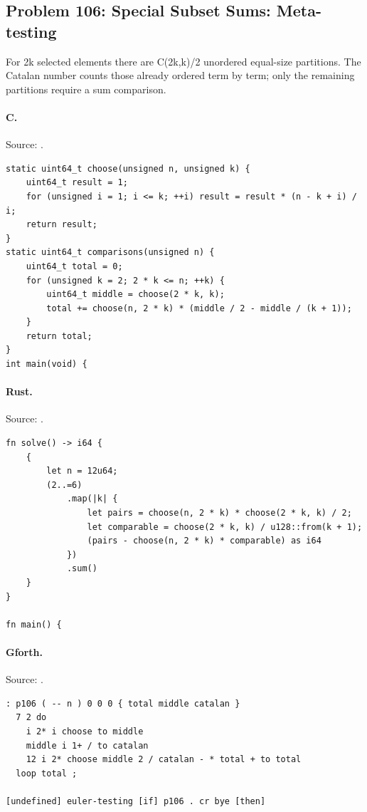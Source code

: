 \subsection{Problem 106: Special Subset Sums: Meta-testing}
\label{walkthrough:p106}
For 2k selected elements there are C(2k,k)/2 unordered equal-size partitions. The Catalan number counts those already ordered term by term; only the remaining partitions require a sum comparison.

\paragraph{C.} Source: .
\begin{lstlisting}
static uint64_t choose(unsigned n, unsigned k) {
    uint64_t result = 1;
    for (unsigned i = 1; i <= k; ++i) result = result * (n - k + i) / i;
    return result;
}
static uint64_t comparisons(unsigned n) {
    uint64_t total = 0;
    for (unsigned k = 2; 2 * k <= n; ++k) {
        uint64_t middle = choose(2 * k, k);
        total += choose(n, 2 * k) * (middle / 2 - middle / (k + 1));
    }
    return total;
}
int main(void) {
\end{lstlisting}

\paragraph{Rust.} Source: .
\begin{lstlisting}
fn solve() -> i64 {
    {
        let n = 12u64;
        (2..=6)
            .map(|k| {
                let pairs = choose(n, 2 * k) * choose(2 * k, k) / 2;
                let comparable = choose(2 * k, k) / u128::from(k + 1);
                (pairs - choose(n, 2 * k) * comparable) as i64
            })
            .sum()
    }
}

fn main() {
\end{lstlisting}

\paragraph{Gforth.} Source: .
\begin{lstlisting}
: p106 ( -- n ) 0 0 0 { total middle catalan }
  7 2 do
    i 2* i choose to middle
    middle i 1+ / to catalan
    12 i 2* choose middle 2 / catalan - * total + to total
  loop total ;

[undefined] euler-testing [if] p106 . cr bye [then]
\end{lstlisting}

